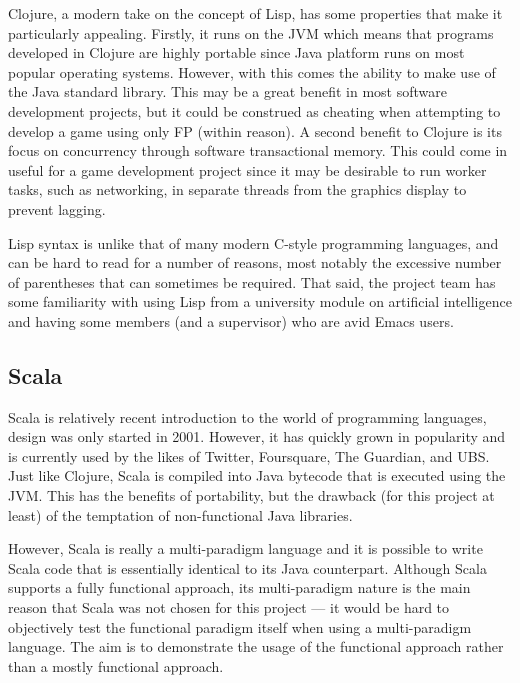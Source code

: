 Clojure, a modern take on the concept of Lisp, has some properties that make it particularly appealing. Firstly, it runs on the JVM which means that programs developed in Clojure are highly portable since Java platform runs on most popular operating systems. However, with this comes the ability to make use of the Java standard library. This may be a great benefit in most software development projects, but it could be construed as cheating when attempting to develop a game using only FP (within reason). A second benefit to Clojure is its focus on concurrency through software transactional memory. This could come in useful for a game development project since it may be desirable to run worker tasks, such as networking, in separate threads from the graphics display to prevent lagging.

Lisp syntax is unlike that of many modern C-style programming languages, and can be hard to read for a number of reasons, most notably the excessive number of parentheses that can sometimes be required. That said, the project team has some familiarity with using Lisp from a university module on artificial intelligence and having some members (and a supervisor) who are avid Emacs users.

\subsection{Scala}



Scala is relatively recent introduction to the world of programming languages, design was only started in 2001. However, it has quickly grown in popularity and is currently used by the likes of Twitter, Foursquare, The Guardian, and UBS. Just like Clojure, Scala is compiled into Java bytecode that is executed using the JVM. This has the benefits of portability, but the drawback (for this project at least) of the temptation of non-functional Java libraries.

However, Scala is really a multi-paradigm language and it is possible to write Scala code that is essentially identical to its Java counterpart. Although Scala supports a fully functional approach, its multi-paradigm nature is the main reason that Scala was not chosen for this project --- it would be hard to objectively test the functional paradigm itself when using a multi-paradigm language. The aim is to demonstrate the usage of the functional approach rather than a mostly functional approach. 


